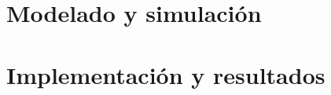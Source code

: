 \documentclass[\main/main.tex]{subfiles}
\begin{document}
	\chapter{Modelado y simulación}\label{Modelado y simulacion}
		
		\newpage
		\newpage
	\chapter{Implementación y resultados}\label{Implementacion y resultados}
		
		\newpage
\end{document}
